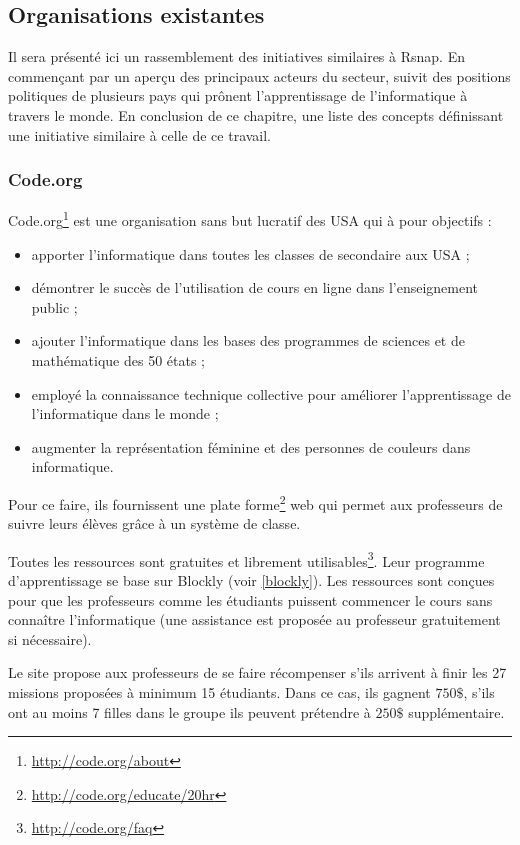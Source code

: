 \subsection{Organisations existantes}
Il sera présenté ici un rassemblement des initiatives similaires à Rsnap. En commençant par un aperçu des principaux acteurs du secteur, suivit des positions politiques de plusieurs pays qui prônent l'apprentissage de l'informatique à travers le monde. En conclusion de ce chapitre, une liste des concepts définissant une initiative similaire à celle de ce travail.
\subsubsection{Code.org}
Code.org\footnote{\url{http://code.org/about}} est une organisation sans but lucratif des USA qui à pour objectifs :
\begin{itemize}
  \item apporter l'informatique dans toutes les classes de secondaire aux USA ;
  \item démontrer le succès de l'utilisation de cours en ligne dans l'enseignement public ;
  \item ajouter l'informatique dans les bases des programmes de sciences et de mathématique des 50 états ;
  \item employé la connaissance technique collective pour améliorer l'apprentissage de l'informatique dans le monde ;
  \item augmenter la représentation féminine et des personnes de couleurs dans informatique.
\end{itemize}

Pour ce faire, ils fournissent une plate forme\footnote{\url{http://code.org/educate/20hr}} web qui permet aux professeurs de suivre leurs élèves grâce à un système de classe.

Toutes les ressources sont gratuites et librement utilisables\footnote{\url{http://code.org/faq}}. Leur programme d'apprentissage se base sur Blockly (voir \ref{blockly}).
Les ressources sont conçues pour que les professeurs comme les étudiants puissent commencer le cours sans connaître l'informatique (une assistance est proposée au professeur gratuitement si nécessaire).

Le site propose aux professeurs de se faire récompenser s'ils arrivent à finir les 27 missions proposées à minimum 15 étudiants. Dans ce cas, ils gagnent $750\$$, s'ils ont au moins 7 filles dans le groupe ils peuvent prétendre à $250\$$ supplémentaire.

